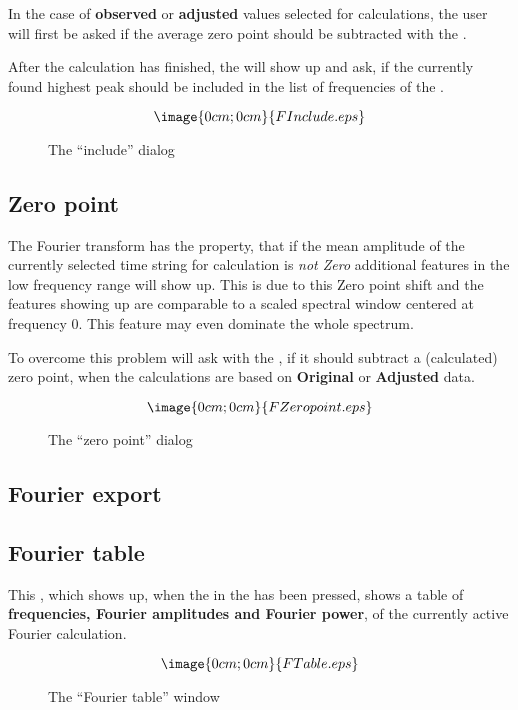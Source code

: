 In the case of {\bf observed} or {\bf adjusted} values selected 
for calculations, the user will first be
asked if the average zero point should be subtracted with the
%
.

After the calculation has finished, the
will show up and ask, if the currently found highest peak
should be included in the list of frequencies of the
%
.

\begin{figure}[h]
$$\image{0cm;0cm}{FInclude.eps}$$%
\caption{The ``include'' dialog}%
\label{fourier.include.dialog}
\end{figure}

\subsection{Zero point}%
\label{fourier.zeropoint}
The Fourier transform has the property, that if the mean amplitude
of the currently selected time string for calculation is {\it not Zero}
additional features in the low frequency range will show up.
This is due to this Zero point shift and the features showing up are 
comparable to a scaled spectral window centered at frequency 0.
This feature may even dominate the whole spectrum.

To overcome this problem \period will ask with the
, if
it should subtract a (calculated) zero point, when the calculations
are based on {\bf Original} or {\bf Adjusted} data.
\begin{figure}[h]
$$\image{0cm;0cm}{FZeropoint.eps}$$%
\caption{The ``zero point'' dialog}%
\label{fourier.zeropoint.dialog}
\end{figure}

\subsection{Fourier export}%
\label{fourier.export}

\subsection{Fourier table}%
\label{fourier.table}
This ,
which shows up, when the  in the
 has been pressed,
shows a table of {\bf frequencies, Fourier amplitudes and Fourier power},
of the currently active Fourier calculation.
\begin{figure}[h]
$$\image{0cm;0cm}{FTable.eps}$$%
\caption{The ``Fourier table'' window}%
\label{fourier.table.window}
\end{figure}

